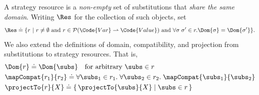 \begin{definition}\label{def:strategy-resource}
A strategy resource is a \emph{non-empty} set of substitutions that \emph{share the same domain}. Writing $\Res$ for the collection of such objects, set
\begin{align*}
  \Res \doteq \{ r ~|~ r \neq \emptyset \text{ and } r \in \mathcal{P}(\Code{Var} \rightharpoonup \Code{Value}) \text{ and } \forall \sigma\;\sigma' \in r. \Dom{\sigma} = \Dom{\sigma'} \}.
\end{align*}
We also extend the definitions of domain, compatibility, and projection from substitutions to strategy resources. That is,
\begin{align*}
  &\Dom{r} \doteq  \Dom{\subs} \quad \text{for arbitrary } \subs \in r 
  \\&\mapCompat{r_1}{r_2}
  \doteq
  \forall \subs_1 \in r_1.\;\forall \subs_2 \in r_2.\; \mapCompat{\subs_1}{\subs_2}
  \\&\projectTo{r}{X}
  \doteq
  \{\, \projectTo{\subs}{X} \mid \subs \in r \,\}
\end{align*}
\end{definition}

